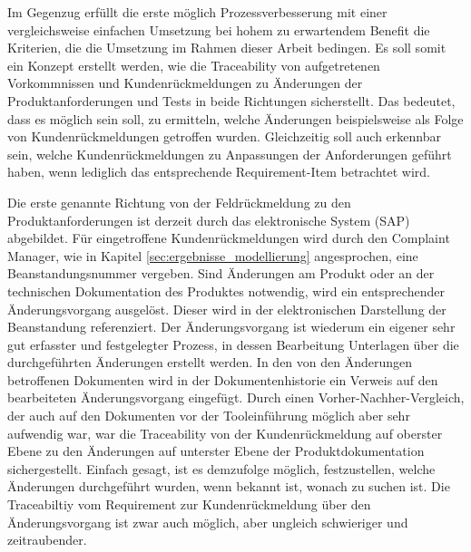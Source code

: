 \documentclass[a4paper,12pt]{report}
\begin{document}
Im Gegenzug erfüllt die erste möglich Prozessverbesserung mit einer vergleichsweise einfachen Umsetzung bei hohem zu erwartendem Benefit die Kriterien, die die Umsetzung im Rahmen dieser Arbeit bedingen. Es soll somit ein Konzept erstellt werden, wie die Traceability von aufgetretenen Vorkommnissen und Kundenrückmeldungen zu Änderungen der Produktanforderungen und Tests in beide Richtungen sicherstellt. Das bedeutet, dass es möglich sein soll, zu ermitteln, welche Änderungen beispielsweise als Folge von Kundenrückmeldungen getroffen wurden. Gleichzeitig soll auch erkennbar sein, welche Kundenrückmeldungen zu Anpassungen der Anforderungen geführt haben, wenn lediglich das entsprechende Requirement-Item betrachtet wird.

Die erste genannte Richtung von der Feldrückmeldung zu den Produktanforderungen ist derzeit durch das elektronische System (SAP) abgebildet. Für eingetroffene Kundenrückmeldungen wird durch den Complaint Manager, wie in Kapitel \ref{sec:ergebnisse_modellierung} angesprochen, eine Beanstandungsnummer vergeben. Sind Änderungen am Produkt oder an der technischen Dokumentation des Produktes notwendig, wird ein entsprechender Änderungsvorgang ausgelöst. Dieser wird in der elektronischen Darstellung der Beanstandung referenziert. Der Änderungsvorgang ist wiederum ein eigener sehr gut erfasster und festgelegter Prozess, in dessen Bearbeitung Unterlagen über die durchgeführten Änderungen erstellt werden. In den von den Änderungen betroffenen Dokumenten wird in der Dokumentenhistorie ein Verweis auf den bearbeiteten Änderungsvorgang eingefügt. Durch einen Vorher-Nachher-Vergleich, der auch auf den Dokumenten vor der Tooleinführung möglich aber sehr aufwendig war, war die Traceability von der Kundenrückmeldung auf oberster Ebene zu den Änderungen auf unterster Ebene der Produktdokumentation sichergestellt. Einfach gesagt, ist es demzufolge möglich, festzustellen, welche Änderungen durchgeführt wurden, wenn bekannt ist, wonach zu suchen ist. Die Traceabiltiy vom Requirement zur Kundenrückmeldung über den Änderungsvorgang ist zwar auch möglich, aber ungleich schwieriger und zeitraubender.
\end{document}
